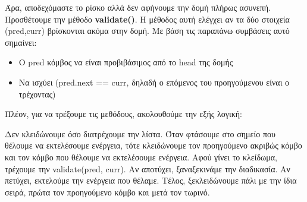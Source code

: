 \documentclass[../final_report.tex]{subfiles}
\begin{document}
Άρα, αποδεχόμαστε το ρίσκο αλλά δεν αφήνουμε την δομή πλήρως ασυνεπή. Προσθέτουμε την μέθοδο \textbf{validate()}. 
Η μέθοδος αυτή ελέγχει αν τα δύο στοιχεία (pred,curr) βρίσκονται ακόμα στην δομή. 
Με βάση τις παραπάνω συμβάσεις αυτό σημαίνει:

\begin{itemize}
    \item O pred κόμβος να είναι προβιβάσιμος από το head της δομής
    \item Να ισχύει (pred.next == curr, δηλαδή ο επόμενος του προηγούμενου είναι ο τρέχοντας)
\end{itemize}

Πλέον, για να τρέξουμε τις μεθόδους, ακολουθούμε την εξής λογική:

Δεν κλειδώνουμε όσο διατρέχουμε την λίστα. Όταν φτάσουμε στο σημείο που θέλουμε να εκτελέσουμε ενέργεια, τότε κλειδώνουμε
τον προηγούμενο ακριβώς κόμβο και τον κόμβο που θέλουμε να εκτελέσουμε ενέργεια. Αφού γίνει το κλείδωμα, τρέχουμε την validate(pred, curr).
Αν αποτύχει, ξαναξεκινάμε την διαδικασία. Αν πετύχει, εκτελούμε την ενέργεια που θέλαμε. Τέλος, ξεκλειδώνουμε πάλι με την ίδια σειρά, πρώτα 
τον προηγούμενο κόμβο και μετά τον τωρινό. 
\end{document}
